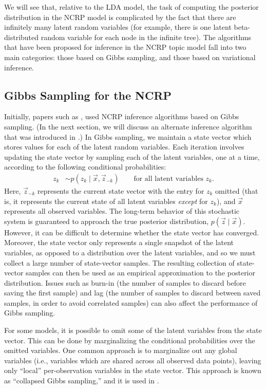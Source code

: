 \documentclass{article}
\begin{document}
We will see that, relative to the LDA model, the task of computing the posterior distribution in the NCRP model is complicated by the fact that there are infinitely many latent random variables (for example, there is one latent beta-distributed random variable for each node in the infinite tree).
The algorithms that have been proposed for inference in the NCRP topic model fall into two main categories: those based on Gibbs sampling, and those based on variational inference.

\subsection{Gibbs Sampling for the NCRP}

Initially, papers such as \cite{griffiths2004hierarchical}, used NCRP inference algorithms based on Gibbs sampling.
(In the next section, we will discuss an alternate inference algorithm that was introduced in \cite{wang2009vi_ncrp}.)
In Gibbs sampling, we maintain a state vector which stores values for each of the latent random variables.
Each iteration involves updating the state vector by sampling each of the latent variables, one at a time, according to the following conditional probabilities:
\begin{align}
z_k &\sim p(z_k \mid \vec x, \vec z_{-k}) \qquad \text{for all latent variables $z_k$.}
\end{align}
Here, $\vec z_{-k}$ represents the current state vector with the entry for $z_k$ omitted (that is, it represents the current state of all latent variables \emph{except} for $z_k$), and $\vec x$ represents all observed variables.
The long-term behavior of this stochastic system is guaranteed to approach the true posterior distribution, $p(\vec z \mid \vec x)$.
However, it can be difficult to determine whether the state vector has converged.
Moreover, the state vector only represents a single snapshot of the latent variables, as opposed to a distribution over the latent variables, and so we must collect a large number of state-vector samples.
The resulting collection of state-vector samples can then be used as an empirical approximation to the posterior distribution.
Issues such as burn-in (the number of samples to discard before saving the first sample) and lag (the number of samples to discard between saved samples, in order to avoid correlated samples) can also affect the performance of Gibbs sampling.

For some models, it is possible to omit some of the latent variables from the state vector.
This can be done by marginalizing the conditional probabilities over the omitted variables.
One common approach is to marginalize out any global variables (i.e., variables which are shared across all observed data points), leaving only ``local'' per-observation variables in the state vector.
This approach is known as ``collapsed Gibbs sampling,'' and it is used in \cite{blei2010ncrp}.
\end{document}

